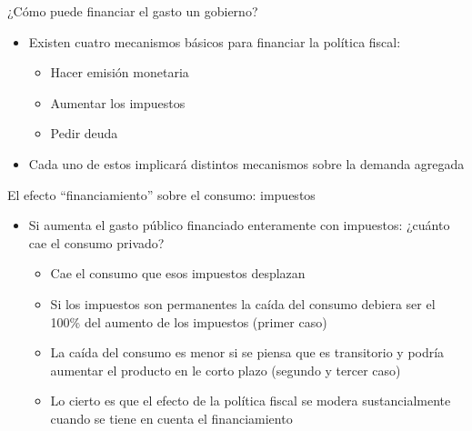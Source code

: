 \documentclass{beamer}
\begin{document}
\begin{frame}{¿Cómo puede financiar el gasto un gobierno?}
    \begin{itemize}
        \item Existen cuatro mecanismos básicos para financiar la política fiscal:
        \begin{itemize}
            \item Hacer emisión monetaria 
            \item Aumentar los impuestos
            \item Pedir deuda
        \end{itemize}
        \vspace{2mm}
        \item Cada uno de estos implicará distintos mecanismos sobre la demanda agregada
    \end{itemize}
\end{frame}


\begin{frame}{El efecto “financiamiento” sobre el consumo: impuestos}
    
    \begin{itemize}
        \item Si aumenta el gasto público financiado enteramente con impuestos: ¿cuánto cae el consumo privado?
        \begin{itemize}
            \item Cae el consumo que esos impuestos desplazan
            \item Si los impuestos son permanentes la caída del consumo debiera ser el 100\% del aumento de los impuestos (primer caso)
            \item La caída del consumo es menor si se piensa que es transitorio y podría aumentar el producto en le corto plazo (segundo y tercer caso)
            \item Lo cierto es que el efecto de la política fiscal se modera sustancialmente cuando se tiene en cuenta el financiamiento
        \end{itemize}
        \end{itemize}

\end{frame}


    
\end{document}
